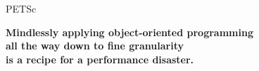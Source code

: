 \begin{frame}{PETSc}
   \begin{center} \Large \textbf{Mindlessly applying object-oriented programming \\[1em]
                                 all the way down to fine granularity \\[1em]
                                 is a recipe for a performance disaster.} \end{center}
                                                                               
\end{frame}
